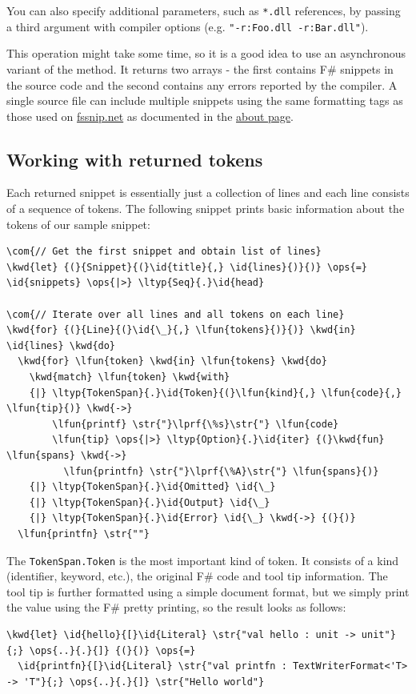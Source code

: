 \documentclass{article}
\newcommand{\id}[1]{\textcolor{black}{#1}}
\newcommand{\com}[1]{\textcolor{officegreen}{#1}}
\newcommand{\kwd}[1]{\textcolor{navy}{#1}}
\newcommand{\ops}[1]{\textcolor{purple}{#1}}
\newcommand{\str}[1]{\textcolor{olive}{#1}}
\begin{document}
You can also specify additional parameters, such as \texttt{*.dll} references, by passing
a third argument with compiler options (e.g. \texttt{"-r:Foo.dll -r:Bar.dll"}).


This operation might take some time, so it is a good idea to use an asynchronous
variant of the method. It returns two arrays - the first contains F\# snippets
in the source code and the second contains any errors reported by the compiler.
A single source file can include multiple snippets using the same formatting tags
as those used on \href{http://www.fssnip.net}{fssnip.net} as documented in the
\href{http://www.fssnip.net/pages/About}{about page}.
\subsection*{Working with returned tokens}



Each returned snippet is essentially just a collection of lines and each line
consists of a sequence of tokens. The following snippet prints basic information
about the tokens of our sample snippet:
\begin{Verbatim}[commandchars=\\\{\}]
\com{// Get the first snippet and obtain list of lines}
\kwd{let} {(}{Snippet}{(}\id{title}{,} \id{lines}{)}{)} \ops{=} \id{snippets} \ops{|>} \ltyp{Seq}{.}\id{head}

\com{// Iterate over all lines and all tokens on each line}
\kwd{for} {(}{Line}{(}\id{\_}{,} \lfun{tokens}{)}{)} \kwd{in} \id{lines} \kwd{do}
  \kwd{for} \lfun{token} \kwd{in} \lfun{tokens} \kwd{do}
    \kwd{match} \lfun{token} \kwd{with}
    {|} \ltyp{TokenSpan}{.}\id{Token}{(}\lfun{kind}{,} \lfun{code}{,} \lfun{tip}{)} \kwd{->}
        \lfun{printf} \str{"}\lprf{\%s}\str{"} \lfun{code}
        \lfun{tip} \ops{|>} \ltyp{Option}{.}\id{iter} {(}\kwd{fun} \lfun{spans} \kwd{->}
          \lfun{printfn} \str{"}\lprf{\%A}\str{"} \lfun{spans}{)}
    {|} \ltyp{TokenSpan}{.}\id{Omitted} \id{\_}
    {|} \ltyp{TokenSpan}{.}\id{Output} \id{\_}
    {|} \ltyp{TokenSpan}{.}\id{Error} \id{\_} \kwd{->} {(}{)}
  \lfun{printfn} \str{""}
\end{Verbatim}



The \texttt{TokenSpan.Token} is the most important kind of token. It consists of a kind
(identifier, keyword, etc.), the original F\# code and tool tip information.
The tool tip is further formatted using a simple document format, but we simply
print the value using the F\# pretty printing, so the result looks as follows:
\begin{Verbatim}[commandchars=\\\{\}]
\kwd{let} \id{hello}{[}\id{Literal} \str{"val hello : unit -> unit"}{;} \ops{..}{.}{]} {(}{)} \ops{=}
  \id{printfn}{[}\id{Literal} \str{"val printfn : TextWriterFormat<'T> -> 'T"}{;} \ops{..}{.}{]} \str{"Hello world"}

\end{Verbatim}
\end{document}

